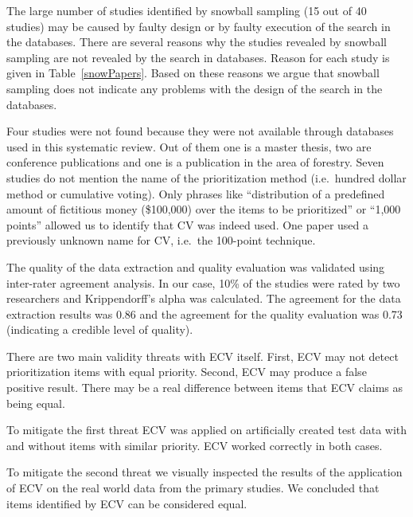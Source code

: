 The large number of studies identified by snowball sampling (15 out of 40 studies) may be caused by faulty design or by faulty execution of the search in the databases.
There are several reasons why the studies revealed by snowball sampling are not revealed by the search in databases. Reason for each study is given in Table~\ref{snowPapers}.
Based on these reasons we argue that snowball sampling does not indicate any problems with the design of the search in the databases.

Four studies were not found because they were not available through databases used in this systematic review. Out of them one is a master thesis, two are conference publications and one is a publication in the area of forestry.
Seven studies do not mention the name of the prioritization method (i.e.\ hundred dollar method or cumulative voting).
Only phrases like ``distribution of a predefined amount of fictitious money (\$100,000) over the items to be prioritized'' or ``1,000 points'' allowed us to identify that CV was indeed used. One paper used a previously unknown name for CV, i.e.\ the 100-point technique.

The quality of the data extraction and quality evaluation was validated using inter-rater agreement analysis.
In our case, 10\% of the studies were rated by two researchers and Krippendorff's alpha was calculated.
The agreement for the data extraction results was 0.86 and the agreement for the quality evaluation was 0.73 (indicating a credible level of quality).
%

There are two main validity threats with ECV itself.
First, ECV may not detect prioritization items with equal priority.
Second, ECV may produce a false positive result. There may be a real difference between items that ECV claims as being equal.

To mitigate the first threat ECV was applied on artificially created test data with and without items with similar priority.
ECV worked correctly in both cases.

To mitigate the second threat we visually inspected the results of the application of ECV on the real world data from the primary studies.
We concluded that items identified by ECV can be considered equal.

